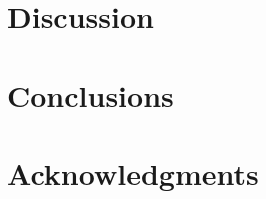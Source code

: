 \documentclass{article}
\begin{document}
\begin{multicols}{2}
\section{Discussion} 

\section{Conclusions} 
\section*{Acknowledgments}



\end{multicols}
\end{document}
